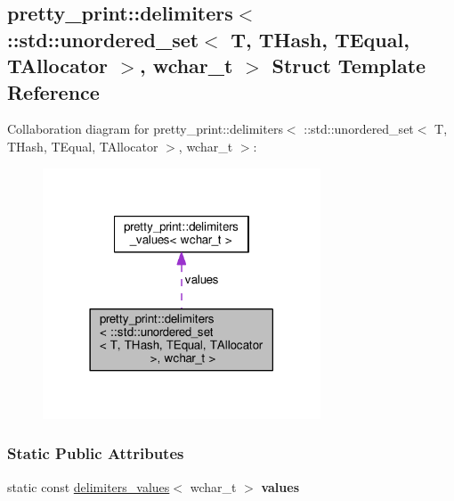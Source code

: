 \hypertarget{structpretty__print_1_1delimiters_3_01_1_1std_1_1unordered__set_3_01T_00_01THash_00_01TEqual_00_b9dca71ea935633d29c7d36890ecd10a}{}\subsection{pretty\+\_\+print\+:\+:delimiters$<$ \+:\+:std\+:\+:unordered\+\_\+set$<$ T, T\+Hash, T\+Equal, T\+Allocator $>$, wchar\+\_\+t $>$ Struct Template Reference}
\label{structpretty__print_1_1delimiters_3_01_1_1std_1_1unordered__set_3_01T_00_01THash_00_01TEqual_00_b9dca71ea935633d29c7d36890ecd10a}


Collaboration diagram for pretty\+\_\+print\+:\+:delimiters$<$ \+:\+:std\+:\+:unordered\+\_\+set$<$ T, T\+Hash, T\+Equal, T\+Allocator $>$, wchar\+\_\+t $>$\+:
\nopagebreak
\begin{figure}[H]
\begin{center}
\leavevmode
\includegraphics[width=234pt]{structpretty__print_1_1delimiters_3_01_1_1std_1_1unordered__set_3_01T_00_01THash_00_01TEqual_00_2466888a20c583147ded04daed07d319}
\end{center}
\end{figure}
\subsubsection*{Static Public Attributes}
\begin{DoxyCompactItemize}
\item 
static const \hyperlink{structpretty__print_1_1delimiters__values}{delimiters\+\_\+values}$<$ wchar\+\_\+t $>$ {\bfseries values}\hypertarget{structpretty__print_1_1delimiters_3_01_1_1std_1_1unordered__set_3_01T_00_01THash_00_01TEqual_00_b9dca71ea935633d29c7d36890ecd10a_a80937537e70dbaf536e25d94b6a5fc64}{}\label{structpretty__print_1_1delimiters_3_01_1_1std_1_1unordered__set_3_01T_00_01THash_00_01TEqual_00_b9dca71ea935633d29c7d36890ecd10a_a80937537e70dbaf536e25d94b6a5fc64}

\end{DoxyCompactItemize}


